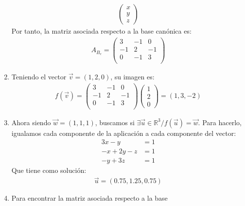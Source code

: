 \documentclass{article}
\begin{document}
\begin{enumerate}[label={(\alph*)}]
\begin{equation}
\begin{split}
\begin{pmatrix}
x \\
y \\
z\end{pmatrix}
		\end{split}
	\end{equation}
	Por tanto, la matriz asociada respecto a la base canónica es:
	\begin{equation}
		\begin{split}
			A_{B_c}=  \begin{pmatrix}
3 & -1 & 0 \\
-1 & 2 & -1 \\
0 & -1 & 3 \\
\end{pmatrix}
		\end{split}
	\end{equation}
\item Teniendo el vector \(\vec{v}=(1,2,0)\), su imagen es:
	\begin{equation}
		\begin{split}
			f(\vec{v})= \begin{pmatrix}
3 & -1 & 0 \\
-1 & 2 & -1 \\
0 & -1 & 3 \\
\end{pmatrix}\begin{pmatrix}
1 \\
2 \\
0\end{pmatrix}=(1,3,-2)
		\end{split}
	\end{equation}
\item Ahora siendo \(\vec{w}=(1,1,1)\), buscamos si \(\exists \vec{u} \in \mathbb{R}^{3} /
	f(\vec{u})=\vec{w}\). Para hacerlo, igualamos cada componente de la aplicación a cada
	componente del vector:
	\begin{equation}
		\begin{split}
			3x-y&=1\\-x+2y-z&=1\\-y+3z&=1
		\end{split}
	\end{equation}
	Que tiene como solución:
	\begin{equation}
		\begin{split}
			\vec{u}=(0.75,1.25,0.75)
		\end{split}
	\end{equation}
\item Para encontrar la matriz asociada respecto a la base

\end{enumerate}
\end{document}
